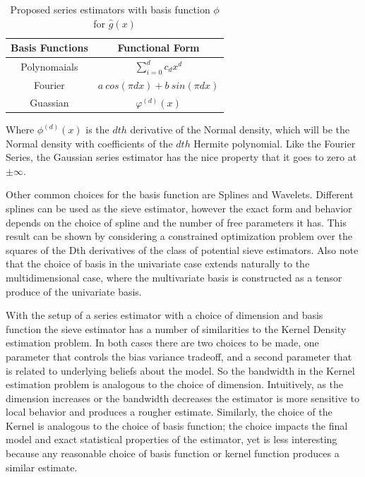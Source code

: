 \documentclass[12pt]{article}  %
\begin{document}
\begin{table}[h]
\begin{center}
\begin{tabular}{|c|c|}
\hline
Basis Functions & Functional Form\\
\hline
Polynomaials & $\sum_{i=0}^{d} c_d x^d$\\
Fourier &$a~cos(\pi d x) + b~sin(\pi d x)$\\
Guassian &$\varphi^{(d)}(x)$\\
\hline
\end{tabular}
\caption {Proposed series estimators with basis function $\phi$ for $\hat{g}(x)$ }
\label{tab:basis}
\end{center}
\end{table}
Where $\phi^{(d)}(x)$ is the $dth$ derivative of the Normal density, which will be the Normal density with coefficients  of the $dth$ Hermite polynomial. Like the Fourier Series, the Gaussian series estimator has the nice property that it goes to zero at $\pm \infty$.

Other common choices for the basis function are Splines and Wavelets.  Different splines can be used as the sieve estimator, however the exact form and behavior depends on the choice of spline and the number of free parameters it has.  This result can be shown by considering a constrained optimization problem over the squares of the Dth derivatives of the class of potential sieve estimators. Also note that the choice of basis in the univariate case extends naturally to the multidimensional case, where the multivariate basis is constructed as a tensor produce of the univariate basis\cite{Chen}.

With the setup of a series estimator with a choice of dimension and basis function the sieve estimator has a number of similarities to the Kernel Density estimation problem.  In both cases there are two choices to be made, one parameter that controls the bias variance tradeoff, and a second parameter that is related to underlying beliefs about the model.  So the bandwidth in the Kernel estimation problem is analogous to the choice of dimension. Intuitively, as the dimension increases or the bandwidth decreases the estimator is more sensitive to local behavior and produces a rougher estimate. Similarly, the choice of the Kernel is analogous to the choice of basis function; the choice impacts the final model and exact statistical properties of the estimator, yet is less interesting because any reasonable choice of basis function or kernel function produces a similar estimate. 
\end{document}
